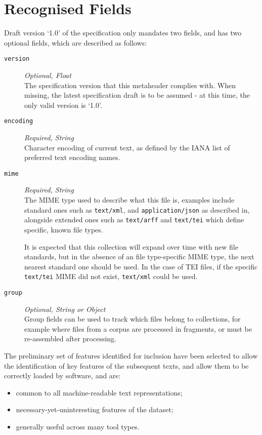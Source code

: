 \section{Recognised Fields}

Draft version `1.0' of the specification only mandates two fields, and has two optional fields, which are described as follows:

\begin{description}
    \item[\texttt{version}] \textit{Optional, Float} \hfill \\
        The specification version that this metaheader complies with.
        When missing, the latest specification draft is to be assumed - at this time, the only valid version is `1.0'.
        
    \item[\texttt{encoding}] \textit{Required, String} \hfill \\
        Character encoding of current text, as defined by the IANA list of preferred text encoding names\cite{EncodingNames}.
    
    \item[\texttt{mime}] \textit{Required, String} \hfill \\
        The MIME type used to describe what this file is, examples include standard ones such as \texttt{text/xml}, and \texttt{application/json} as described in\cite{MIMETypes}, alongside extended ones such as \texttt{text/arff} and \texttt{text/tei} which define specific, known file types.
        
        It is expected that this collection will expand over time with new file standards, but in the absence of an file type-specific MIME type, the next nearest standard one should be used.
        In the case of TEI files, if the specific \texttt{text/tei} MIME did not exist, \texttt{text/xml} could be used.
    
    \item[\texttt{group}] \textit{Optional, String or Object} \hfill \\
        Group fields can be used to track which files belong to collections, for example where files from a corpus are processed in fragments, or must be re-assembled after processing.
        
\end{description}

The preliminary set of features identified for inclusion have been selected to allow the identification of key features of the subsequent texts, and allow them to be correctly loaded by software, and are:

\begin{itemize}
    \item common to all machine-readable text representations;
    \item necessary-yet-uninteresting features of the dataset;
    \item generally useful across many tool types.
\end{itemize}
